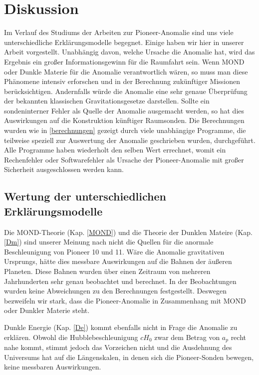 \section{Diskussion}

Im Verlauf des Studiums der Arbeiten zur Pioneer-Anomalie sind uns viele unterschiedliche Erklärungsmodelle begegnet. Einige haben wir hier in unserer Arbeit vorgestellt. Unabhängig davon, welche Ursache die Anomalie hat, wird das Ergebnis ein großer Informationsgewinn für die Raumfahrt sein. Wenn MOND oder Dunkle Materie für die Anomalie verantwortlich wären, so muss man diese Phänomene intensiv erforschen und in der Berechnung zukünftiger Missionen berücksichtigen. Andernfalls würde die Anomalie eine sehr genaue Überprüfung der bekannten klassischen Gravitationsgesetze darstellen. Sollte ein sondeninterner Fehler als Quelle der Anomalie ausgemacht werden, so hat dies Auswirkungen auf die Konstruktion künftiger Raumsonden. Die Berechnungen wurden wie in \ref{berechnungen} gezeigt durch viele unabhängige Programme, die teilweise speziell zur Auswertung der Anomalie geschrieben wurden, durchgeführt. Alle Programme haben wiederholt den selben Wert errechnet, womit ein Rechenfehler oder Softwarefehler als Ursache der Pioneer-Anomalie mit großer Sicherheit ausgeschlossen werden kann.

\bigskip

\subsection{Wertung der unterschiedlichen Erklärungsmodelle}
Die MOND-Theorie (Kap. \ref{MOND}) und die Theorie der Dunklen Mateire (Kap. \ref{Dm}) sind unserer Meinung nach nicht die Quellen für die anormale Beschleunigung von Pioneer 10 und 11. Wäre die Anomalie gravitativen Ursprungs, hätte dies messbare Auswirkungen auf die Bahnen der äußeren Planeten. Diese Bahnen wurden über einen Zeitraum von mehreren Jahrhunderten sehr genau beobachtet und berechnet. In der Beobachtungen wurden keine Abweichungen zu den Berechnungen festgestellt. Deswegen bezweifeln wir stark, dass die Pioneer-Anomalie in Zusammenhang mit MOND oder Dunkler Materie steht.

\bigskip

Dunkle Energie (Kap. \ref{De}) kommt ebenfalls nicht in Frage die Anomalie zu erklären. Obwohl die Hubblebeschleunigung $cH_0$ zwar dem Betrag von $a_p$ recht nahe kommt, stimmt jedoch das Vorzeichen nicht und die Ausdehnung des Universums hat auf die Längenskalen, in denen sich die Pioneer-Sonden bewegen, keine messbaren Auswirkungen.

